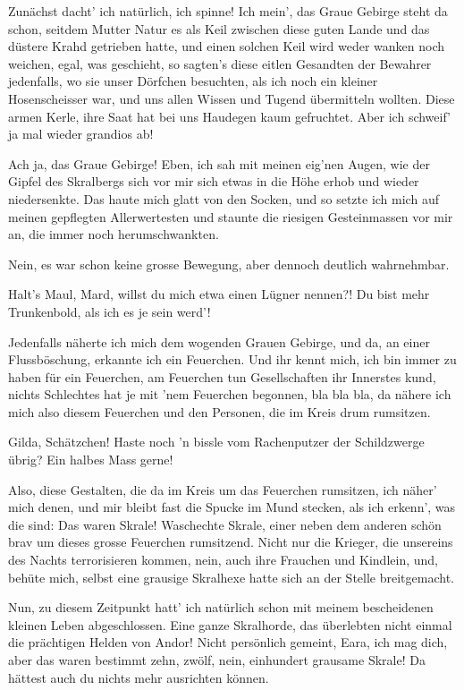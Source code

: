 Zunächst dacht’ ich natürlich, ich spinne! Ich mein’, das Graue Gebirge steht da schon, seitdem Mutter Natur es als Keil zwischen diese guten Lande und das düstere Krahd getrieben hatte, und einen solchen Keil wird weder wanken noch weichen, egal, was geschieht, so sagten’s diese eitlen Gesandten der Bewahrer jedenfalls, wo sie unser Dörfchen besuchten, als ich noch ein kleiner Hosenscheisser war, und uns allen Wissen und Tugend übermitteln wollten. Diese armen Kerle, ihre Saat hat bei uns Haudegen kaum gefruchtet. Aber ich schweif’ ja mal wieder grandios ab!

Ach ja, das Graue Gebirge! Eben, ich sah mit meinen eig'nen Augen, wie der Gipfel des Skralbergs sich vor mir sich etwas in die Höhe erhob und wieder niedersenkte. Das haute mich glatt von den Socken, und so setzte ich mich auf meinen gepflegten Allerwertesten und staunte die riesigen Gesteinmassen vor mir an, die immer noch herumschwankten.

Nein, es war schon keine grosse Bewegung, aber dennoch deutlich wahrnehmbar.

Halt’s Maul, Mard, willst du mich etwa einen Lügner nennen?! Du bist mehr Trunkenbold, als ich es je sein werd’!

Jedenfalls näherte ich mich dem wogenden Grauen Gebirge, und da, an einer Flussböschung, erkannte ich ein Feuerchen. Und ihr kennt mich, ich bin immer zu haben für ein Feuerchen, am Feuerchen tun Gesellschaften ihr Innerstes kund, nichts Schlechtes hat je mit ’nem Feuerchen begonnen, bla bla bla, da nähere ich mich also diesem Feuerchen und den Personen, die im Kreis drum rumsitzen.

Gilda, Schätzchen! Haste noch ’n bissle vom Rachenputzer der Schildzwerge übrig? Ein halbes Mass gerne!

Also, diese Gestalten, die da im Kreis um das Feuerchen rumsitzen, ich näher’ mich denen, und mir bleibt fast die Spucke im Mund stecken, als ich erkenn’, was die sind: Das waren Skrale! Waschechte Skrale, einer neben dem anderen schön brav um dieses grosse Feuerchen rumsitzend. Nicht nur die Krieger, die unsereins des Nachts terrorisieren kommen, nein, auch ihre Frauchen und Kindlein, und, behüte mich, selbst eine grausige Skralhexe hatte sich an der Stelle breitgemacht.

Nun, zu diesem Zeitpunkt hatt’ ich natürlich schon mit meinem bescheidenen kleinen Leben abgeschlossen. Eine ganze Skralhorde, das überlebten nicht einmal die prächtigen Helden von Andor! Nicht persönlich gemeint, Eara, ich mag dich, aber das waren bestimmt zehn, zwölf, nein, einhundert grausame Skrale! Da hättest auch du nichts mehr ausrichten können.

